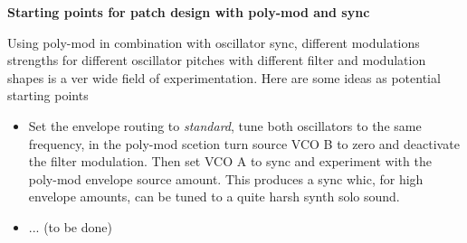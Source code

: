 \textbf{Starting points for patch design with poly-mod and sync}

Using poly-mod in combination with oscillator sync, different modulations strengths for different oscillator pitches with different filter and modulation shapes is a ver wide field of experimentation. Here are some ideas as potential starting points

\begin{itemize}
  \item Set the envelope routing to \textit{standard}, tune both oscillators to the same frequency, in the poly-mod scetion turn source VCO B to zero and deactivate the filter modulation. Then set VCO A to sync and experiment with the poly-mod envelope source amount. This produces a sync whic, for high envelope amounts, can be tuned to a quite harsh synth solo sound.
  \item ... (to be done)
\end{itemize} 
